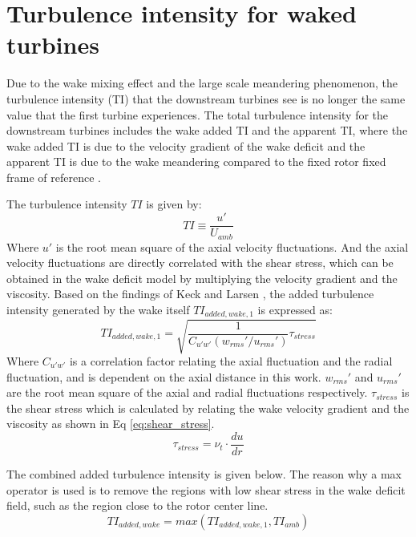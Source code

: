 \documentclass{umthesis}
\begin{document}
\section{Turbulence intensity for waked turbines}\label{sec:waked_TI}
Due to the wake mixing effect and the large scale meandering phenomenon, the turbulence intensity (TI) that the downstream turbines see is no longer the same value that the first turbine experiences. The total turbulence intensity for the downstream turbines includes the wake added TI and the apparent TI, where the wake added TI is due to the velocity gradient of the wake deficit and the apparent TI is due to the wake meandering compared to the fixed rotor fixed frame of reference \cite{Keck_two}.

The turbulence intensity $TI$ is given by:
\begin{equation}
  TI\equiv \frac{u'}{U_{amb}}
\end{equation}
Where $u'$ is the root mean square of the axial velocity fluctuations. And the axial velocity fluctuations are directly correlated with the shear stress, which can be obtained in the wake deficit model by multiplying the velocity gradient and the viscosity. Based on the findings of Keck \cite{Keck_two} and Larsen \cite{Larsen_wake}, the added turbulence intensity generated by the wake itself $TI_{added,wake,1}$ is expressed as:
\begin{equation}
  TI_{added,wake,1}=\sqrt{\frac{1}{C_{u'w'}(w_{rms}'/u_{rms}')}\tau_{stress}}
\end{equation}
Where $C_{u'w'}$ is a correlation factor relating the axial fluctuation and the radial fluctuation, and is dependent on the axial distance in this work. $w_{rms}'$ and $u_{rms}'$ are the root mean square of the axial and radial fluctuations respectively. $\tau_{stress}$ is the shear stress which is calculated by relating the wake velocity gradient and the viscosity as shown in Eq \ref{eq:shear_stress}.
\begin{equation} \label{eq:shear_stress}
  \tau_{stress}=\nu_t\cdot\frac{du}{dr}
\end{equation}


The combined added turbulence intensity is given below. The reason why a max operator is used is to remove the regions with low shear stress in the wake deficit field, such as the region close to the rotor center line.
\begin{equation} \label{eq:TI_added}
  TI_{added,wake}=max(TI_{added,wake,1},TI_{amb})
\end{equation}
\end{document}

